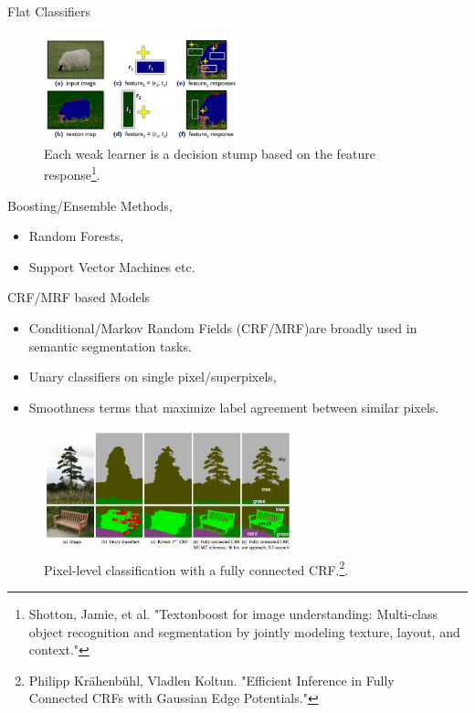 \documentclass{beamer}
\begin{document}
\begin{frame}{Flat Classifiers}
\begin{figure}
	\centering
	\includegraphics[width=0.5\textwidth]{figure/ss12.png}
	\captionsetup{justification=centering}
	\caption{Each weak learner is a decision stump based on the feature response\footnote{Shotton, Jamie, et al. "Textonboost for image understanding: Multi-class\\ object recognition and segmentation by jointly modeling texture, layout, and context."}.}	
\end{figure}
Boosting/Ensemble Methods, 
\begin{itemize}
	\item Random Forests, 
	\item Support Vector Machines etc.
\end{itemize}
\end{frame}	

\begin{frame}{CRF/MRF based Models}
 \begin{itemize}
	 \item {\color{blue}Conditional/Markov Random Fields} (CRF/MRF)are broadly used in semantic segmentation tasks.
	 \item {\color{blue}Unary classifiers} on single pixel/superpixels,
	 \item {\color{blue}Smoothness} terms that maximize label agreement between similar pixels.
\end{itemize}
\vspace{-0.4cm}
\begin{figure}
	\centering
	\includegraphics[width=0.64\textwidth]{figure/ss13.png}
	\captionsetup{justification=centering}
	\caption{Pixel-level classification with a fully connected CRF.\footnote{Philipp Krähenbühl, Vladlen Koltun. "Efficient Inference in Fully\\Connected CRFs with Gaussian Edge Potentials."}.}	
\end{figure}
\end{frame}
\end{document}
